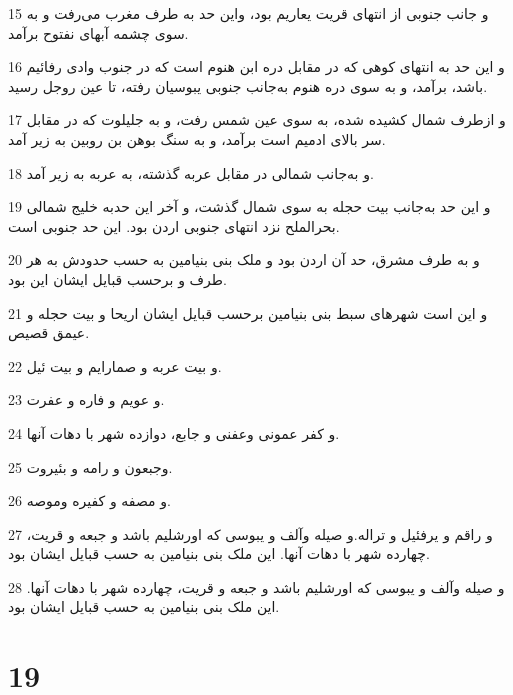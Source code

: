 \par 15 و جانب جنوبی از انتهای قریت یعاریم بود، واین حد به طرف مغرب می‌رفت و به سوی چشمه آبهای نفتوح برآمد.
\par 16 و این حد به انتهای کوهی که در مقابل دره ابن هنوم است که در جنوب وادی رفائیم باشد، برآمد، و به سوی دره هنوم به‌جانب جنوبی یبوسیان رفته، تا عین روجل رسید.
\par 17 و ازطرف شمال کشیده شده، به سوی عین شمس رفت، و به جلیلوت که در مقابل سر بالای ادمیم است برآمد، و به سنگ بوهن بن روبین به زیر آمد.
\par 18 و به‌جانب شمالی در مقابل عربه گذشته، به عربه به زیر آمد.
\par 19 و این حد به‌جانب بیت حجله به سوی شمال گذشت، و آخر این حدبه خلیج شمالی بحرالملح نزد انتهای جنوبی اردن بود. این حد جنوبی است.
\par 20 و به طرف مشرق، حد آن اردن بود و ملک بنی بنیامین به حسب حدودش به هر طرف و برحسب قبایل ایشان این بود.
\par 21 و این است شهرهای سبط بنی بنیامین برحسب قبایل ایشان اریحا و بیت حجله و عیمق قصیص.
\par 22 و بیت عربه و صمارایم و بیت ئیل.
\par 23 و عویم و فاره و عفرت.
\par 24 و کفر عمونی وعفنی و جابع، دوازده شهر با دهات آنها.
\par 25 وجبعون و رامه و بئیروت.
\par 26 و مصفه و کفیره وموصه.
\par 27 و راقم و یرفئیل و تراله.و صیله وآلف و یبوسی که اورشلیم باشد و جبعه و قریت، چهارده شهر با دهات آنها. این ملک بنی بنیامین به حسب قبایل ایشان بود.
\par 28 و صیله وآلف و یبوسی که اورشلیم باشد و جبعه و قریت، چهارده شهر با دهات آنها. این ملک بنی بنیامین به حسب قبایل ایشان بود.
 
\chapter{19}

